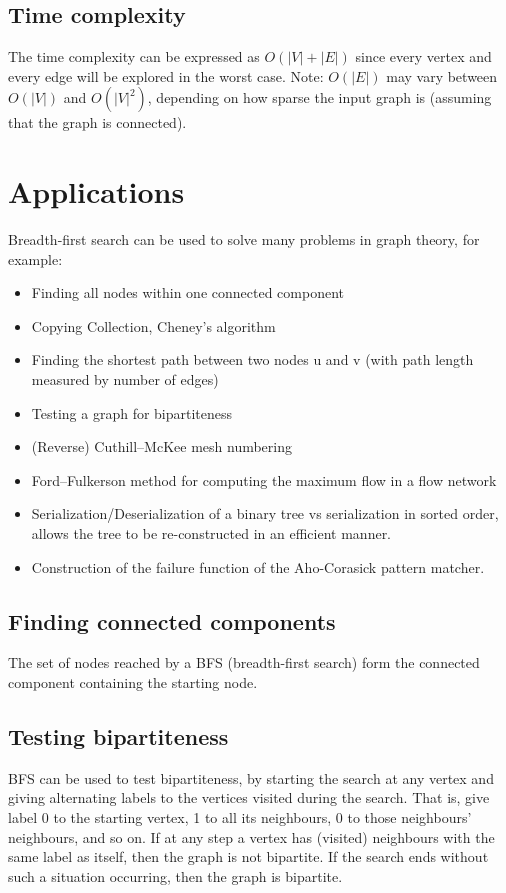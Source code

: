 \documentclass{article}
\begin{document}
  \subsection{Time complexity}

  The time complexity can be expressed as $O(|V|+|E|)$ since every vertex and every edge will be explored in the worst case. Note: $O(|E|)$ may vary between $O(|V|)$ and  $O(|V|^2)$, depending on how sparse the input graph is (assuming that the graph is connected).

  \section{Applications}

  Breadth-first search can be used to solve many problems in graph theory, for example:
  \begin{itemize}
    \item Finding all nodes within one connected component
    \item Copying Collection, Cheney's algorithm
    \item Finding the shortest path between two nodes u and v (with path length measured by number of edges)
    \item Testing a graph for bipartiteness
    \item (Reverse) Cuthill–McKee mesh numbering
    \item Ford–Fulkerson method for computing the maximum flow in a flow network
    \item Serialization/Deserialization of a binary tree vs serialization in sorted order, allows the tree to be re-constructed in an efficient manner.
    \item Construction of the failure function of the Aho-Corasick pattern matcher.
  \end{itemize}

  \subsection{Finding connected components}

  The set of nodes reached by a BFS (breadth-first search) form the connected component containing the starting node.

  \subsection{Testing bipartiteness}

  BFS can be used to test bipartiteness, by starting the search at any vertex and giving alternating labels to the vertices visited during the search. That is, give label 0 to the starting vertex, 1 to all its neighbours, 0 to those neighbours' neighbours, and so on. If at any step a vertex has (visited) neighbours with the same label as itself, then the graph is not bipartite. If the search ends without such a situation occurring, then the graph is bipartite.
\end{document}
